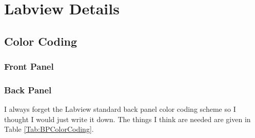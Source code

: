 
\section{Labview Details}
\subsection{Color Coding}
\subsubsection{Front Panel}
\subsubsection{Back Panel}

I always forget the Labview standard back panel color coding scheme so I thought I would just write it down. The things I think are needed are given in Table \ref{Tab:BPColorCoding}. 

